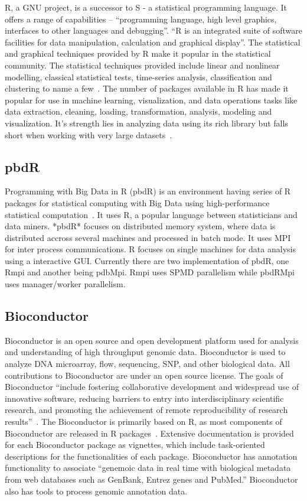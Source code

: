 R, a GNU project, is a successor to S - a statistical programming
language. It offers a range of capabilities – ``programming language,
high level graphics, interfaces to other languages and
debugging''. ``R is an integrated suite of software facilities for
data manipulation, calculation and graphical display''. The
statistical and graphical techniques provided by R make it popular in
the statistical community. The statistical techniques provided include
linear and nonlinear modelling, classical statistical tests,
time-series analysis, classification and clustering to name a
few~\cite{www-R}. The number of packages available in R has made it
popular for use in machine learning, visualization, and data
operations tasks like data extraction, cleaning, loading,
transformation, analysis, modeling and visualization. It's strength
lies in analyzing data using its rich library but falls short when
working with very large datasets~\cite{book-R}.
    
\subsection{pbdR}

Programming with Big Data in R (pbdR) is an environment having series
of R packages for statistical computing with Big Data using
high-performance statistical computation~\cite{www-pbdR}. It uses R, a
popular language between statisticians and data miners. *pbdR* focuses
on distributed memory system, where data is distributed accross
several machines and processed in batch mode. It uses MPI for inter
process communications. R focuses on single machines for data analysis
using a interactive GUI. Currently there are two implementation of
pbdR, one Rmpi and another being pdbMpi.  Rmpi uses SPMD parallelism
while pbdRMpi uses manager/worker parallelism.

    \pv

\subsection{Bioconductor \cv}

Bioconductor is an open source and open development platform used for
analysis and understanding of high throughput genomic
data. Bioconductor is used to analyze DNA microarray, flow,
sequencing, SNP, and other biological data. All contributions to
Bioconductor are under an open source license. The goals of
Bioconductor ``include fostering collaborative development and
widespread use of innovative software, reducing barriers to entry into
interdisciplinary scientific research, and promoting the achievement
of remote reproducibility of research
results''~\cite{bioconductor-article-2004}.  The Bioconductor is
primarily based on R, as most components of Bioconductor are released
in R packages~\cite{www-bioconductor-about}.  Extensive documentation
is provided for each Bioconductor package as vignettes, which include
task-oriented descriptions for the functionalities of each
package. Bioconductor has annotation functionality to associate
``genemoic data in real time with biological metadata from web
databases such as GenBank, Entrez genes and PubMed.''  Bioconductor
also has tools to process genomic annotation data.

